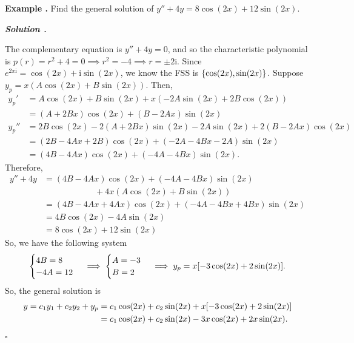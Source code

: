 \documentclass[12pt, a4paper]{article}
\newcounter{index}[subsection]
\newenvironment*{eg}{\begin{framed}\par\noindent\textbf{Example \thesubsection.\stepcounter{index}\theindex}}{\par\end{framed}}
\newcounter{nprf}[subsection]
\newenvironment*{sol}{\par\indent\textbf{\textit{Solution \stepcounter{nprf}\thenprf.}}\par}{\hfill{$\square$}\par}
\def\i{{\mathrm{i}}}
\begin{document}
\begin{eg}
	Find the general solution of $y''+4y=8\cos(2x)+12\sin(2x)$.
	\begin{sol}
		The complementary equation is $y''+4y=0$, and so the characteristic polynomial is $p(r)=r^2+4=0\implies r^2=-4\implies r=\pm2\i$. Since $e^{2x\i}=\cos(2x)+\i\sin(2x)$, we know the FSS is $\qty{\cos(2x),\sin(2x)}$. Suppose $y_p=x(A\cos(2x)+B\sin(2x))$. Then, \begin{align*}y_p'&=A\cos(2x)+B\sin(2x)+x(-2A\sin(2x)+2B\cos(2x))\\&=(A+2Bx)\cos(2x)+(B-2Ax)\sin(2x)\\y_p''&=2B\cos(2x)-2(A+2Bx)\sin(2x)-2A\sin(2x)+2(B-2Ax)\cos(2x)\\&=(2B-4Ax+2B)\cos(2x)+(-2A-4Bx-2A)\sin(2x)\\&=(4B-4Ax)\cos(2x)+(-4A-4Bx)\sin(2x).\end{align*} Therefore, \begin{align*}y''+4y&=(4B-4Ax)\cos(2x)+(-4A-4Bx)\sin(2x)\\&\qquad\qquad\qquad+4x(A\cos(2x)+B\sin(2x))\\&=(4B-4Ax+4Ax)\cos(2x)+(-4A-4Bx+4Bx)\sin(2x)\\&=4B\cos(2x)-4A\sin(2x)\\&=8\cos(2x)+12\sin(2x)\end{align*} So, we have the following system \[\begin{cases}4B=8\\-4A=12\end{cases}\implies\begin{cases}A=-3\\B=2\end{cases}\implies y_p=x\qty[-3\cos(2x)+2\sin(2x)].\] So, the general solution is \begin{align*}y=c_1y_1+c_2y_2+y_p&=c_1\cos(2x)+c_2\sin(2x)+x\qty[-3\cos(2x)+2\sin(2x)]\\&=c_1\cos(2x)+c_2\sin(2x)-3x\cos(2x)+2x\sin(2x).\end{align*}	
	\end{sol}
\end{eg}
\end{document}
